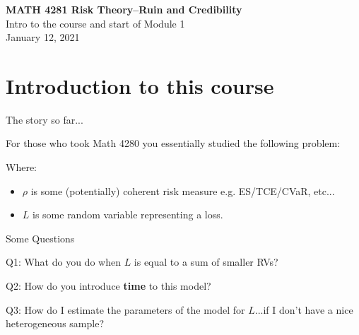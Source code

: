 \documentclass[11pt]{beamer}
\begin{document}
\begin{frame}
  \frametitle{}
  \begin{center}
    \textbf{\large MATH 4281 Risk Theory--Ruin and Credibility}\\
    \vspace{1cm}
    {\large  Intro to the course and start of Module 1} \\
    \vspace{1cm}
    {\large  January 12, 2021}
    \end{center}
    \vspace{1cm}
\end{frame}
\begin{frame}
\tableofcontents
\end{frame}
\section{Introduction to this course}
\begin{frame}{The story so far...}

For those who took Math 4280 you essentially studied the following problem: 
\vfill
\begin{center}
\end{center}
\vfill
Where:
\begin{itemize}

\item $\rho$ is some (potentially) coherent risk measure e.g. ES/TCE/CVaR, etc...

\item $L$ is some random variable representing a loss.

\end{itemize}

\end{frame}
\begin{frame}{Some Questions}

Q1: What do you do when $L$ is equal to a sum of smaller RVs?

\vfill

Q2: How do you introduce \textbf{time} to this model?

\vfill

Q3: How do I estimate the parameters of the model for $L$...if I don't have a nice heterogeneous sample?

\end{frame}
\end{document}
